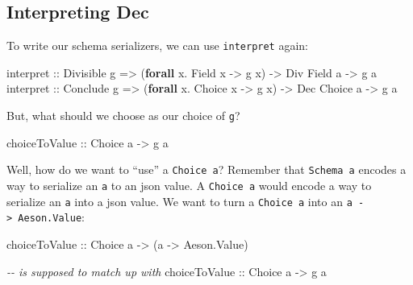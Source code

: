 \documentclass[]{article}
\newenvironment{Shaded}{}{}
\newcommand{\CommentTok}[1]{\textcolor[rgb]{0.38,0.63,0.69}{\textit{#1}}}
\newcommand{\DataTypeTok}[1]{\textcolor[rgb]{0.56,0.13,0.00}{#1}}
\newcommand{\KeywordTok}[1]{\textcolor[rgb]{0.00,0.44,0.13}{\textbf{#1}}}
\newcommand{\NormalTok}[1]{#1}
\newcommand{\OperatorTok}[1]{\textcolor[rgb]{0.40,0.40,0.40}{#1}}
\newcommand{\OtherTok}[1]{\textcolor[rgb]{0.00,0.44,0.13}{#1}}
\begin{document}
\subsection{Interpreting Dec}\label{interpreting-dec}

To write our schema serializers, we can use \texttt{interpret} again:

\begin{Shaded}
\begin{Highlighting}[]
\OtherTok{interpret ::} \DataTypeTok{Divisible}\NormalTok{ g }\OtherTok{=\textgreater{}}\NormalTok{ (}\KeywordTok{forall}\NormalTok{ x}\OperatorTok{.} \DataTypeTok{Field}\NormalTok{  x }\OtherTok{{-}\textgreater{}}\NormalTok{ g x) }\OtherTok{{-}\textgreater{}} \DataTypeTok{Div} \DataTypeTok{Field}\NormalTok{  a }\OtherTok{{-}\textgreater{}}\NormalTok{ g a}
\OtherTok{interpret ::} \DataTypeTok{Conclude}\NormalTok{ g  }\OtherTok{=\textgreater{}}\NormalTok{ (}\KeywordTok{forall}\NormalTok{ x}\OperatorTok{.} \DataTypeTok{Choice}\NormalTok{ x }\OtherTok{{-}\textgreater{}}\NormalTok{ g x) }\OtherTok{{-}\textgreater{}} \DataTypeTok{Dec} \DataTypeTok{Choice}\NormalTok{ a }\OtherTok{{-}\textgreater{}}\NormalTok{ g a}
\end{Highlighting}
\end{Shaded}

But, what should we choose as our choice of \texttt{g}?

\begin{Shaded}
\begin{Highlighting}[]
\OtherTok{choiceToValue ::} \DataTypeTok{Choice}\NormalTok{ a }\OtherTok{{-}\textgreater{}}\NormalTok{ g a}
\end{Highlighting}
\end{Shaded}

Well, how do we want to ``use'' a \texttt{Choice\ a}? Remember that
\texttt{Schema\ a} encodes a way to serialize an \texttt{a} to an json value. A
\texttt{Choice\ a} would encode a way to serialize an \texttt{a} into a json
value. We want to turn a \texttt{Choice\ a} into an
\texttt{a\ -\textgreater{}\ Aeson.Value}:

\begin{Shaded}
\begin{Highlighting}[]
\OtherTok{choiceToValue ::} \DataTypeTok{Choice}\NormalTok{ a }\OtherTok{{-}\textgreater{}}\NormalTok{ (a }\OtherTok{{-}\textgreater{}} \DataTypeTok{Aeson.Value}\NormalTok{)}

\CommentTok{{-}{-} is supposed to match up with}
\OtherTok{choiceToValue ::} \DataTypeTok{Choice}\NormalTok{ a }\OtherTok{{-}\textgreater{}}\NormalTok{ g a}
\end{Highlighting}
\end{Shaded}
\end{document}
